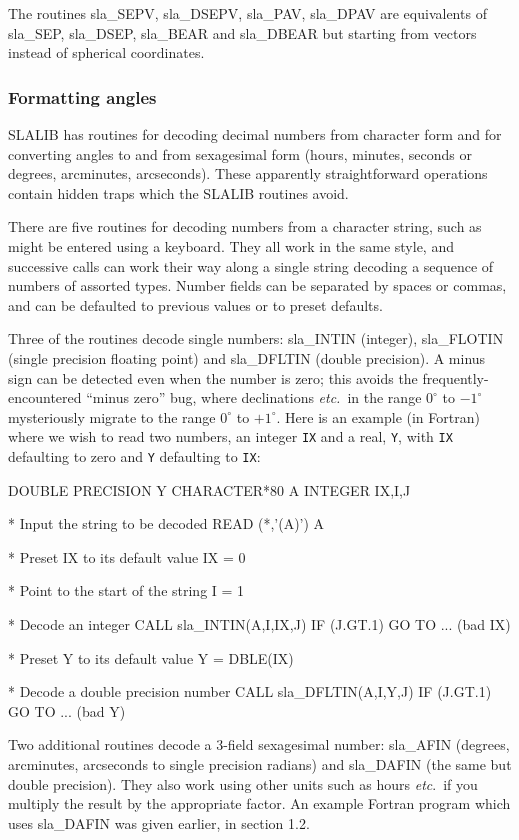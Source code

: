 \documentclass[11pt,twoside,nolof]{starlink}
\begin{document}
The routines
sla\_SEPV,
sla\_DSEPV,
sla\_PAV,
sla\_DPAV
are equivalents of sla\_SEP, sla\_DSEP, sla\_BEAR and sla\_DBEAR
but starting from vectors
instead of spherical coordinates.

\subsubsection{Formatting angles}
SLALIB has routines for decoding decimal numbers
from character form and for converting angles to and from
sexagesimal form (hours, minutes, seconds or degrees,
arcminutes, arcseconds).  These apparently straightforward
operations contain hidden traps which the SLALIB routines
avoid.

There are five routines for decoding numbers from a character
string, such as might be entered using a keyboard.
They all work in the same style, and successive calls
can work their way along a single string decoding
a sequence of numbers of assorted types.  Number
fields can be separated by spaces or commas, and can be defaulted
to previous values or to preset defaults.

Three of the routines decode single numbers:
sla\_INTIN
(integer),
sla\_FLOTIN
(single precision floating point) and
sla\_DFLTIN
(double precision).  A minus sign can be
detected even when the number is zero;  this avoids
the frequently-encountered ``minus zero'' bug, where
declinations \textit{etc.}\ in
the range $0^{\circ}$ to $-1^{\circ}$ mysteriously migrate to
the range $0^{\circ}$ to $+1^{\circ}$.
Here is an example (in Fortran) where we wish to
read two numbers, an integer \texttt{IX} and a real, \texttt{Y},
with \texttt{IX} defaulting to zero and \texttt{Y} defaulting to
\texttt{IX}:
\goodbreak
\begin{terminalv}
            DOUBLE PRECISION Y
            CHARACTER*80 A
            INTEGER IX,I,J

      *  Input the string to be decoded
            READ (*,'(A)') A

      *  Preset IX to its default value
            IX = 0

      *  Point to the start of the string
            I = 1

      *  Decode an integer
            CALL sla_INTIN(A,I,IX,J)
            IF (J.GT.1) GO TO ... (bad IX)

      *  Preset Y to its default value
            Y = DBLE(IX)

      *  Decode a double precision number
            CALL sla_DFLTIN(A,I,Y,J)
            IF (J.GT.1) GO TO ... (bad Y)
\end{terminalv}
\goodbreak
Two additional routines decode a 3-field sexagesimal number:
sla\_AFIN
(degrees, arcminutes, arcseconds to single
precision radians) and
sla\_DAFIN
(the same but double precision).  They also
work using other units such as hours \textit{etc}.\ if
you multiply the result by the appropriate factor.  An example
Fortran program which uses
sla\_DAFIN
was given earlier, in section 1.2.
\end{document}

